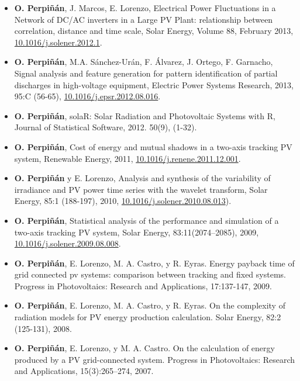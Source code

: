 \documentclass[article, a4paper]{memoir}
\begin{document}
\begin{itemize}
\item \textbf{O. Perpiñán}, J. Marcos, E. Lorenzo, Electrical Power Fluctuations in a Network of DC/AC inverters in a Large PV Plant: relationship between correlation, distance and time scale, Solar Energy, Volume 88, February 2013, \href{http://dx.doi.org/10.1016/j.solener.2012.1}{10.1016/j.solener.2012.1}.

\item \textbf{O. Perpiñán}, M.A. Sánchez-Urán, F. Álvarez, J. Ortego, F. Garnacho, Signal analysis and feature generation for pattern identification of partial discharges in high-voltage equipment, Electric Power Systems Research, 2013, 95:C (56-65), \href{http://dx.doi.org/10.1016/j.epsr.2012.08.016}{10.1016/j.epsr.2012.08.016}.

\item \textbf{O. Perpiñán}, solaR: Solar Radiation and Photovoltaic Systems with R, Journal of Statistical Software, 2012. 50(9), (1-32).

\item \textbf{O. Perpiñán}, Cost of energy and mutual shadows in a two-axis tracking PV system, Renewable Energy, 2011, \url{10.1016/j.renene.2011.12.001}.

\item \textbf{O. Perpiñán} y E. Lorenzo, Analysis and synthesis of the variability of irradiance and PV power time series with the wavelet transform, Solar Energy, 85:1 (188-197), 2010, \url{10.1016/j.solener.2010.08.013}).

\item \textbf{O. Perpiñán}, Statistical analysis of the performance and simulation of a two-axis tracking PV system, Solar Energy, 83:11(2074–2085), 2009, \url{10.1016/j.solener.2009.08.008}.

\item \textbf{O. Perpiñán}, E. Lorenzo, M. A. Castro, y R. Eyras. Energy payback time of grid connected pv systems: comparison between tracking and fixed systems. Progress in Photovoltaics: Research and Applications, 17:137-147, 2009.

\item \textbf{O. Perpiñán}, E. Lorenzo, M. A. Castro, y R. Eyras. On the complexity of radiation models for PV energy production calculation. Solar Energy, 82:2 (125-131), 2008.

\item \textbf{O. Perpiñán}, E. Lorenzo, y M. A. Castro. On the calculation of energy produced by a PV grid-connected system. Progress in Photovoltaics: Research and Applications, 15(3):265–274, 2007.
\end{itemize}
\end{document}
